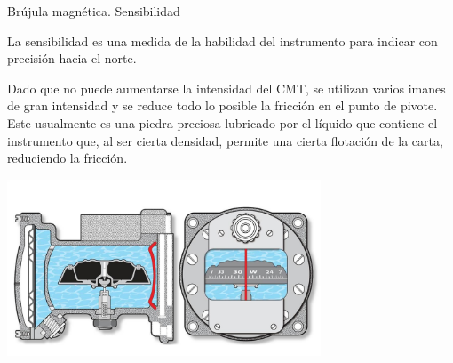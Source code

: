 \begin{frame}{  Br\'ujula magn\'etica. Sensibilidad }


  La sensibilidad es una medida de la habilidad del instrumento para indicar con precisi\'on hacia el norte.

  Dado que no puede aumentarse la intensidad del CMT, se utilizan varios imanes de gran intensidad y
  se reduce todo lo posible la fricci\'on en el punto de pivote.
  Este usualmente es una piedra preciosa lubricado por el l\'iquido que contiene el instrumento que, al
  ser cierta densidad, permite una cierta flotaci\'on de la carta, reduciendo la fricci\'on.
  
  \begin{center}
  \includegraphics[width=0.7\textwidth]{05.instrumentos.giroscopicos.imagenes/05.04.MagnetismoTerrestre/05-04-1704f_pf_hiw_16x9.jpg}
\end{center}

  
\end{frame}

